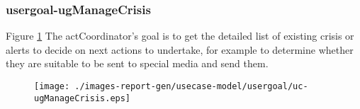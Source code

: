 \subsubsection{usergoal-ugManageCrisis}

\label{RE-use-case-ugManageCrisis}



Figure \ref{fig:lu.uni.lassy.excalibur.icrash-spec-RE-UCD-uc-ugManageCrisis}
The actCoordinator's goal is to get the detailed list of existing crisis or alerts to decide on next actions to undertake, for example to determine whether they are suitable to be sent to special media and send them.

\begin{figure}[htbp]
\begin{center}

\texttt{[image: ./images-report-gen/usecase-model/usergoal/uc-ugManageCrisis.eps]}
\end{center}
\caption[lu.uni.lassy.excalibur.icrash-spec Use Case Diagram: uc-ugManageCrisis]{}
\label{fig:lu.uni.lassy.excalibur.icrash-spec-RE-UCD-uc-ugManageCrisis}
\end{figure}
\vspace{0.5cm}
